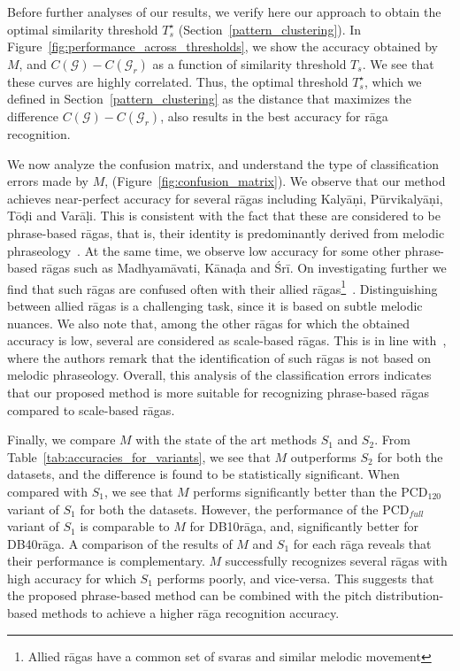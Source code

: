 Before further analyses of our results, we verify here our approach to obtain the optimal similarity threshold $T_{s}^\star$ (Section~\ref{pattern_clustering}). In Figure~\ref{fig:performance_across_thresholds}, we show the accuracy obtained by $M$, and  $C(\mathcal{G})-C(\mathcal{G}_r)$ as a function of similarity threshold $T_{s}$. We see that these curves are highly correlated. Thus, the optimal threshold $T_{s}^\star$, which we defined in Section~\ref{pattern_clustering} as the distance that maximizes the difference $C(\mathcal{G})-C(\mathcal{G}_r)$, also results in the best accuracy for r\={a}ga recognition.

We now analyze the confusion matrix, and understand the type of classification errors made by $M$, (Figure~\ref{fig:confusion_matrix}). We observe that our method achieves near-perfect accuracy for several r\={a}gas including Kaly\={a}\d{n}i, P\={u}rvikaly\={a}\d{n}i, T\={o}\d{d}i and Var\={a}\d{l}i. This is consistent with the fact that these are considered to be phrase-based r\={a}gas, that is, their identity is predominantly derived from melodic phraseology~\cite{krishna2012carnatic}. At the same time, we observe low accuracy for some other phrase-based r\={a}gas such as Madhyam\={a}vati, K\={a}na\d{d}a and \'{S}r\={i}. On investigating further we find that such r\={a}gas are confused often with their allied r\={a}gas\footnote{Allied r\={a}gas have a common set of svaras and similar melodic movement}~\cite{krishna2012carnatic}. Distinguishing between allied r\={a}gas is a challenging task, since it is based on subtle melodic nuances. We also note that, among the other r\={a}gas for which the obtained accuracy is low, several are considered as scale-based r\={a}gas. This is in line with~\cite{krishna2012carnatic}, where the authors remark that the identification of such r\={a}gas is not based on melodic phraseology. Overall, this analysis of the classification errors indicates that our proposed method is more suitable for recognizing phrase-based r\={a}gas compared to scale-based r\={a}gas. 


Finally, we compare $M$ with the state of the art methods $S_1$ and $S_2$. From Table~\ref{tab:accuracies_for_variants}, we see that $M$ outperforms $S_2$ for both the datasets, and the difference is found to be statistically significant. When compared with $S_1$, we see that $M$ performs significantly better than the $\mathrm{PCD}_{120}$ variant of $S_1$ for both the datasets. However, the performance of the $\mathrm{PCD}_{full}$ variant of $S_1$ is comparable to $M$ for DB10r\={a}ga, and, significantly better for DB40r\={a}ga. A comparison of the results of $M$ and $S_1$ for each r\={a}ga reveals that their performance is complementary. $M$ successfully recognizes several r\={a}gas with high accuracy for which $S_1$ performs poorly, and vice-versa. This suggests that the proposed phrase-based method can be combined with the pitch distribution-based methods to achieve a higher r\={a}ga recognition accuracy.



